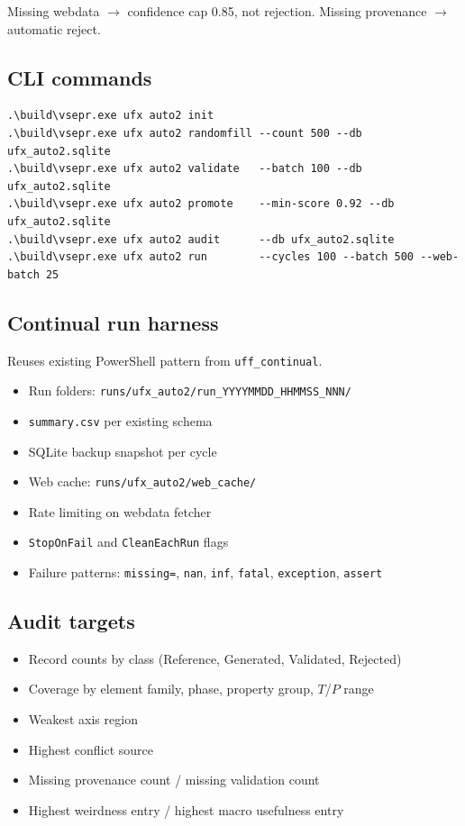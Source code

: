\documentclass[11pt, a4paper]{article}
\begin{document}
Missing webdata $\rightarrow$ confidence cap 0.85, not rejection. Missing provenance $\rightarrow$ automatic reject.

\subsection{CLI commands}

\begin{lstlisting}[language={}]
.\build\vsepr.exe ufx auto2 init
.\build\vsepr.exe ufx auto2 randomfill --count 500 --db ufx_auto2.sqlite
.\build\vsepr.exe ufx auto2 validate   --batch 100 --db ufx_auto2.sqlite
.\build\vsepr.exe ufx auto2 promote    --min-score 0.92 --db ufx_auto2.sqlite
.\build\vsepr.exe ufx auto2 audit      --db ufx_auto2.sqlite
.\build\vsepr.exe ufx auto2 run        --cycles 100 --batch 500 --web-batch 25
\end{lstlisting}

\subsection{Continual run harness}

Reuses existing PowerShell pattern from \texttt{uff\_continual}.

\begin{itemize}[leftmargin=*, itemsep=2pt]
  \item Run folders: \texttt{runs/ufx\_auto2/run\_YYYYMMDD\_HHMMSS\_NNN/}
  \item \texttt{summary.csv} per existing schema
  \item SQLite backup snapshot per cycle
  \item Web cache: \texttt{runs/ufx\_auto2/web\_cache/}
  \item Rate limiting on webdata fetcher
  \item \texttt{StopOnFail} and \texttt{CleanEachRun} flags
  \item Failure patterns: \texttt{missing=}, \texttt{nan}, \texttt{inf}, \texttt{fatal}, \texttt{exception}, \texttt{assert}
\end{itemize}

\subsection{Audit targets}

\begin{itemize}[leftmargin=*, itemsep=2pt]
  \item Record counts by class (Reference, Generated, Validated, Rejected)
  \item Coverage by element family, phase, property group, $T$/$P$ range
  \item Weakest axis region
  \item Highest conflict source
  \item Missing provenance count / missing validation count
  \item Highest weirdness entry / highest macro usefulness entry
\end{itemize}
\end{document}
